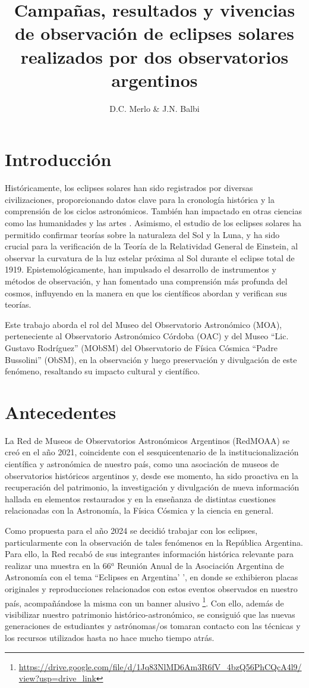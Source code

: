 \documentclass[baaa]{baaa}
\title{Campañas, resultados y vivencias de observación de eclipses solares realizados por dos observatorios argentinos}
\author{
D.C. Merlo\inst{1}
\&
J.N. Balbi\inst{2}
}
\institute{
Museo del Observatorio Astronómico Córdoba (MOA), UNC, Argentina.
\and
Museo ``Lic. Gustavo Rodríguez'' del  Observatorio de Física Cósmica ``P. Bussolini'' (MObSM), Argentina.
}
\begin{document}
\maketitle
\section{Introducci\'on}\label{intro}
Históricamente, los eclipses solares han sido registrados por diversas civilizaciones, proporcionando datos clave para la cronología histórica y la comprensión de los ciclos astronómicos.
También han impactado en otras ciencias como las humanidades y las artes \citep{10.1093/oso/9780192857996.001.0001}. Asimismo, el estudio de los eclipses solares ha permitido
confirmar teorías sobre la naturaleza del Sol y la Luna, y ha sido crucial para la verificación de la Teoría de la Relatividad General de Einstein, al observar la curvatura de la luz estelar 
próxima al Sol durante el eclipse total de 1919.
Epistemológicamente, han impulsado el desarrollo de instrumentos y métodos de observación, y han fomentado una comprensión más profunda del cosmos,
influyendo en la manera en que los científicos abordan y verifican sus teorías.

Este trabajo aborda el rol del Museo del Observatorio Astronómico (MOA), perteneciente al Observatorio Astronómico Córdoba (OAC) y
del Museo ``Lic. Gustavo Rodríguez'' (MObSM) del Observatorio de Física Cósmica ``Padre Bussolini'' (ObSM), en la observación y luego preservación y divulgación de este fenómeno,
resaltando su impacto cultural y científico.

\section{Antecedentes}\label{ante}

La Red de Museos de Observatorios Astronómicos Argentinos (RedMOAA) se creó en el año 2021, coincidente con el sesquicentenario de la institucionalización científica y astronómica de nuestro país, como una asociación de museos
de observatorios históricos argentinos \citep{2023BAAA...64..323M} y, desde ese momento, ha sido proactiva en la recuperación del patrimonio, la investigación y divulgación de
nueva información hallada en elementos restaurados y en la enseñanza de distintas cuestiones relacionadas con la Astronomía, la Física Cósmica y la ciencia en general. 

Como propuesta para el año 2024 se decidió trabajar con los eclipses, particularmente con la observación de tales fenómenos en la República Argentina.
Para ello, la Red recabó de sus  integrantes información histórica relevante para realizar una muestra en la 66$^a$ Reunión Anual de la Asociación Argentina
de Astronomía con el tema ``Eclipses en Argentina' ', en donde se exhibieron placas originales y reproducciones relacionados con estos eventos observados en nuestro país, 
acompañándose la misma con un banner alusivo \footnote{\url{https://drive.google.com/file/d/1Jq83NlMD6Am3R6fV_4bzQ56PhCQcA4l9/view?usp=drive_link}}. 
Con ello, además de visibilizar nuestro patrimonio histórico-astronómico, se consiguió que las nuevas generaciones
de estudiantes y astrónomas/os tomaran contacto con las técnicas y los recursos utilizados hasta no hace mucho tiempo atrás.
\end{document}
